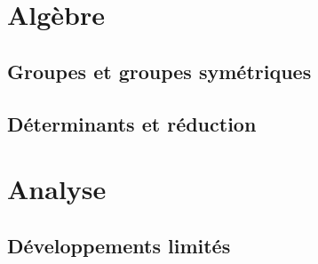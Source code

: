 \documentclass{livre}
\begin{document}
\tableofcontents
\printbibliography

\mainmatter

\part{Algèbre}
\parttoc
\chapter{Groupes et groupes symétriques}

\newpage
\chapter{Déterminants et réduction}


\newpage
\part{Analyse}
\parttoc
\chapter{Développements limités}

\end{document}
